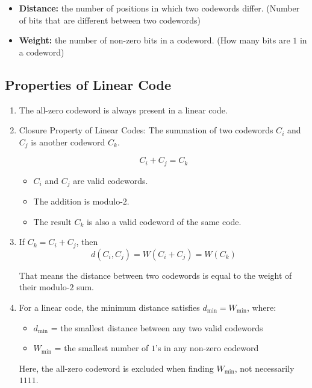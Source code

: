 \documentclass[11pt,a4paper]{book}
\newenvironment{definitionbox}[1][Definition]{%
    \begin{tcolorbox}[
        enhanced,
        breakable,
        colback=primaryblue!10,
        colframe=primaryblue!150,
        title=#1,
        fonttitle=\bfseries,
        sharp corners,
        boxrule=0.8pt,
        left=8pt,
        right=8pt,
        top=6pt,
        bottom=6pt
    ]
}{\end{tcolorbox}}
\newenvironment{formulabox}[1][Formula]{%
    \begin{tcolorbox}[
        enhanced,
        breakable,
        colback=softcoral!10,
        colframe=softcoral!200,
        title=#1,
        fonttitle=\bfseries,
        coltitle=white,
        sharp corners,
        boxrule=1pt,
        left=8pt,
        right=8pt,
        top=6pt,
        bottom=6pt
    ]
}{\end{tcolorbox}}
\begin{document}
\begin{definitionbox}[Distance and Weight]
\begin{itemize}
    \item \textbf{Distance:} the number of positions in which two codewords differ. (Number of bits that are different between two codewords)
    \item \textbf{Weight:} the number of non-zero bits in a codeword. (How many bits are \(1\) in a codeword)
\end{itemize}
\end{definitionbox}

\subsection{Properties of Linear Code}

\begin{enumerate}
    \item The all-zero codeword is always present in a linear code.
    \item Closure Property of Linear Codes: The summation of two codewords \(C_i\) and \(C_j\) is another codeword \(C_k\).
    \begin{formulabox}
        \[
C_i + C_j = C_k
\]
\begin{itemize}
    \item \(C_i\) and \(C_j\) are valid codewords.
    \item The addition is modulo-\(2\).
    \item The result \(C_k\) is also a valid codeword of the same code.
\end{itemize}
\end{formulabox}
    \item \begin{formulabox}
        If \(C_k=C_i+C_j\), then
    \[
    d(C_i,C_j)=W(C_i+C_j)=W(C_k)
    \]
    \end{formulabox}
    That means the distance between two codewords is equal to the weight of their modulo-\(2\) sum.
    \item For a linear code, the minimum distance satisfies \(d_{\min}=W_{\min}\), where:
    \begin{itemize}
        \item \(d_{\min}\) = the smallest distance between any two valid codewords
        \item \(W_{\min}\) = the smallest number of \(1\)'s in any non-zero codeword
    \end{itemize}
    Here, the all-zero codeword is excluded when finding \(W_{\min}\), not necessarily \(1111\).
\end{enumerate}
\end{document}
